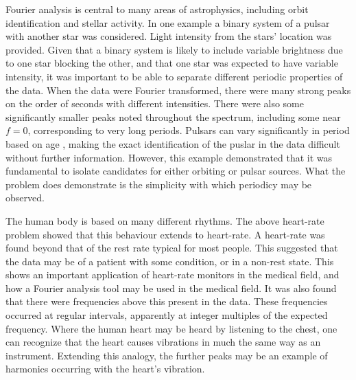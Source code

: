 \documentclass[twocolumn]{article}
\begin{document}
Fourier analysis is central to many areas of astrophysics, including orbit identification and stellar activity. In one example a binary system of a pulsar with another star was considered. Light intensity from the stars' location was provided. Given that a binary system is likely to include variable brightness due to one star blocking the other, and that one star was expected to have variable intensity, it was important to be able to separate different periodic properties of the data. When the data were Fourier transformed, there were many strong peaks on the order of seconds with different intensities. There were also some significantly smaller peaks noted throughout the spectrum, including some near $f=0$, corresponding to very long periods. Pulsars can vary significantly in period based on age \cite{pulsar}, making the exact identification of the puslar in the data difficult without further information. However, this example demonstrated that it was fundamental to isolate candidates for either orbiting or pulsar sources. What the problem does demonstrate is the simplicity with which periodicy may be observed.

The human body is based on many different rhythms. The above heart-rate problem showed that this behaviour extends to heart-rate. A heart-rate was found beyond that of the rest rate typical for most people. This suggested that the data may be of a patient with some condition, or in a non-rest state. This shows an important application of heart-rate monitors in the medical field, and how a Fourier analysis tool may be used in the medical field. It was also found that there were frequencies above this present in the data. These frequencies occurred at regular intervals, apparently at integer multiples of the expected frequency. Where the human heart may be heard by listening to the chest, one can recognize that the heart causes vibrations in much the same way as an instrument. Extending this analogy, the further peaks may be an example of harmonics occurring with the heart's vibration. 
\end{document}
